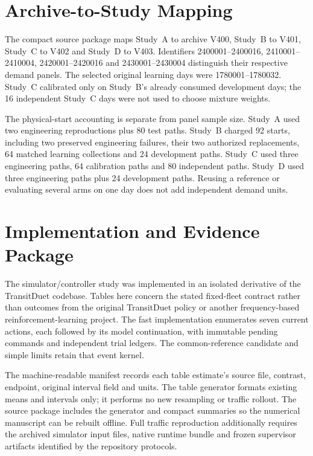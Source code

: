 \section{Archive-to-Study Mapping}
\label{sec:archive}
The compact source package maps Study~A to archive V400, Study~B to V401, Study~C to V402 and Study~D to V403. Identifiers 2400001--2400016, 2410001--2410004, 2420001--2420016 and 2430001--2430004 distinguish their respective demand panels. The selected original learning days were 1780001--1780032. Study~C calibrated only on Study~B's already consumed development days; the 16 independent Study~C days were not used to choose mixture weights.

The physical-start accounting is separate from panel sample size. Study~A used two engineering reproductions plus 80 test paths. Study~B charged 92 starts, including two preserved engineering failures, their two authorized replacements, 64 matched learning collections and 24 development paths. Study~C used three engineering paths, 64 calibration paths and 80 independent paths. Study~D used three engineering paths plus 24 development paths. Reusing a reference or evaluating several arms on one day does not add independent demand units.

\section{Implementation and Evidence Package}
The simulator/controller study was implemented in an isolated derivative of the TransitDuet codebase. Tables here concern the stated fixed-fleet contract rather than outcomes from the original TransitDuet policy or another frequency-based reinforcement-learning project. The fast implementation enumerates seven current actions, each followed by its model continuation, with immutable pending commands and independent trial ledgers. The common-reference candidate and simple limits retain that event kernel.

The machine-readable manifest records each table estimate's source file, contrast, endpoint, original interval field and units. The table generator formats existing means and intervals only; it performs no new resampling or traffic rollout. The source package includes the generator and compact summaries so the numerical manuscript can be rebuilt offline. Full traffic reproduction additionally requires the archived simulator input files, native runtime bundle and frozen supervisor artifacts identified by the repository protocols.

